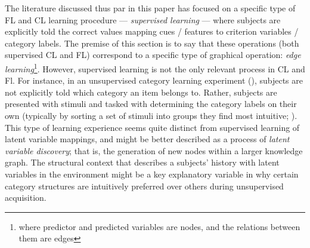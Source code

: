 \documentclass[12pt]{article}
\let\oldcite=\cite
\renewcommand{\cite}[1]{\textcolor[rgb]{0, .121, .388}{\oldcite{#1}}}
\begin{document}
The literature discussed thus par in this paper has focused on a specific type of FL and CL learning procedure --- \emph{supervised learning} --- where subjects are explicitly told the correct values mapping cues / features to criterion variables / category labels. The premise of this section is to say that these operations (both supervised CL and FL) correspond to a specific type of graphical operation: \emph{edge learning}\footnote{where predictor and predicted variables are nodes, and the relations between them are edges}. However, supervised learning is not the only relevant process in CL and Fl. For instance, in an unsupervised category learning experiment (\cite{pothos2011measuring}), subjects are not explicitly told which category an item belongs to. Rather, subjects are presented with stimuli and tasked with determining the category labels on their own (typically by sorting a set of stimuli into groups they find most intuitive; \cite{pothos2011measuring,medin1987family}). This type of learning experience seems quite distinct from supervised learning of latent variable mappings, and might be better described as a process of \emph{latent variable discovery}; that is, the generation of new nodes within a larger knowledge graph. The structural context that describes a subjects' history with latent variables in the environment might be a key explanatory variable in why certain category structures are intuitively preferred over others during unsupervised acquisition.
\end{document}
